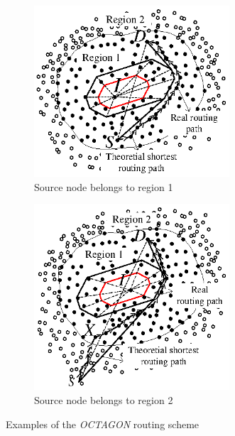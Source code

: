 \begin{figure}[!htb]
\centering
\begin{subfigure}{0.5\textwidth}
  \centering
  \includegraphics[width=0.8\textwidth]{Chapter3/Chapter3Figs/fig-issnip-routing1.eps}
  \caption{Source node belongs to region 1}
  \label{fig-issnip-routing1}
\end{subfigure}%
\begin{subfigure}{0.5\textwidth}
  \centering
  \includegraphics[width=0.8\textwidth]{Chapter3/Chapter3Figs/fig-issnip-routing2.eps}
  \caption{Source node belongs to region 2}
  \label{fig-issnip-routing2}
\end{subfigure}
\caption{Examples of the \emph{OCTAGON} routing scheme}
\label{fig-issnip-routing}
\end{figure}

